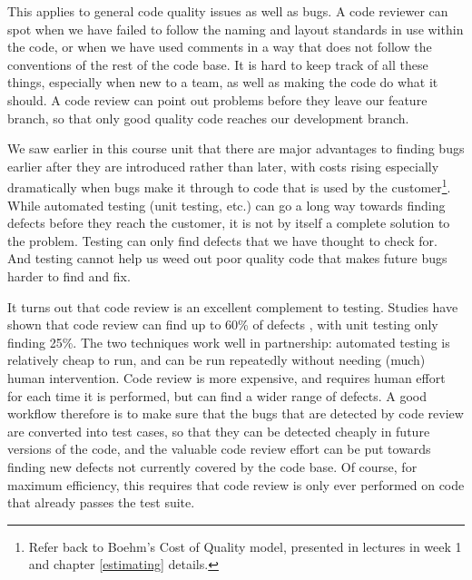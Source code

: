 \documentclass[
]{book}
\begin{document}
This applies to general code quality issues as well as bugs. A code reviewer can spot when we have failed to follow the naming and layout standards in use within the code, or when we have used comments in a way that does not follow the conventions of the rest of the code base. It is hard to keep track of all these things, especially when new to a team, as well as making the code do what it should. A code review can point out problems before they leave our feature branch, so that only good quality code reaches our development branch.

We saw earlier in this course unit that there are major advantages to finding bugs earlier after they are introduced rather than later, with costs rising especially dramatically when bugs make it through to code that is used by the customer\footnote{Refer back to Boehm's Cost of Quality model, presented in lectures in week 1 and chapter \ref{estimating} details.}. While automated testing (unit testing, etc.) can go a long way towards finding defects before they reach the customer, it is not by itself a complete solution to the problem. Testing can only find defects that we have thought to check for. And testing cannot help us weed out poor quality code that makes future bugs harder to find and fix.

It turns out that code review is an excellent complement to testing. Studies have shown that code review can find up to 60\% of defects \citep{codecomplete}, with unit testing only finding 25\%. The two techniques work well in partnership: automated testing is relatively cheap to run, and can be run repeatedly without needing (much) human intervention. Code review is more expensive, and requires human effort for each time it is performed, but can find a wider range of defects. A good workflow therefore is to make sure that the bugs that are detected by code review are converted into test cases, so that they can be detected cheaply in future versions of the code, and the valuable code review effort can be put towards finding new defects not currently covered by the code base. Of course, for maximum efficiency, this requires that code review is only ever performed on code that already passes the test suite.
\end{document}
